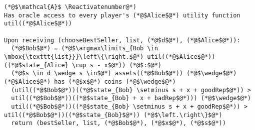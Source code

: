 \Suppressnumber
\begin{lstlisting}[label=distadv, style=numbers]
(*@$\mathcal{A}$ \Reactivatenumber@*)
Has oracle access to every player's (*@$Alice$@*) utility function util((*@$Alice$@*))

Upon receiving (chooseBestSeller, list, (*@$d$@*), (*@$Alice$@*)):
  (*@$Bob$@*) = (*@$\argmax\limits_{Bob \in \mbox{\texttt{list}}}\left\{\right.$@*) util((*@$Alice$@*))((*@$state_{Alice} \cup s - x$@*)) (*@$:$@*)
  (*@$s \in d \wedge s \in$@*) assets((*@$Bob$@*)) (*@$\wedge$@*) (*@$Alice$@*) has (*@$x$@*) coins (*@$\wedge$@*)
  (util((*@$Bob$@*))((*@$state_{Bob} \setminus s + x + goodRep$@*)) >
  util((*@$Bob$@*))((*@$state_{Bob} + x + badRep$@*))) (*@$\wedge$@*)
  util((*@$Bob$@*))((*@$state_{Bob} \setminus s + x + goodRep$@*)) > util((*@$Bob$@*))((*@$state_{Bob}$@*)) (*@$\left.\right\}$@*)
  return (bestSeller, list, (*@$Bob$@*), (*@$x$@*), (*@$s$@*))
\end{lstlisting}
